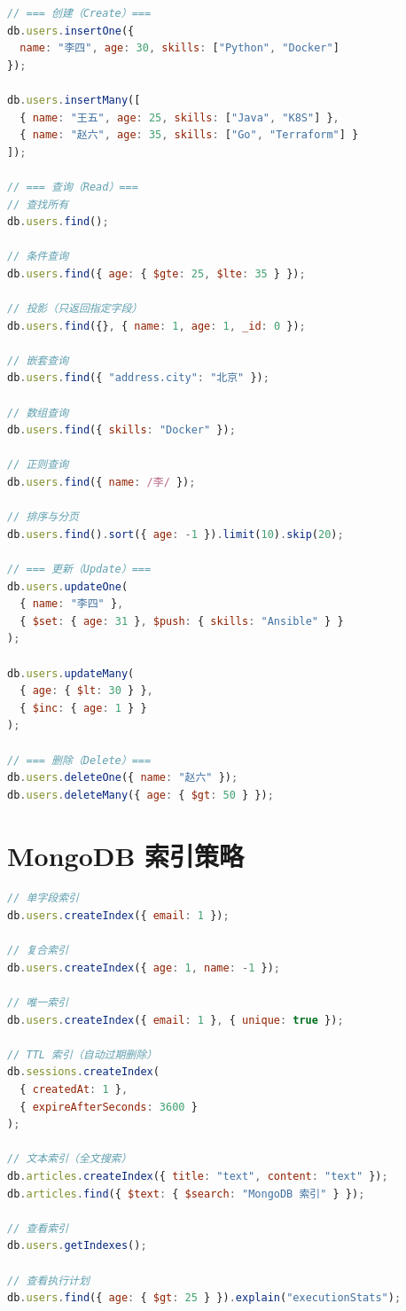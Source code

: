 \documentclass[12pt,UTF8]{ctexbook}
\begin{document}
\begin{lstlisting}[language=javascript]
// === 创建（Create）===
db.users.insertOne({
  name: "李四", age: 30, skills: ["Python", "Docker"]
});

db.users.insertMany([
  { name: "王五", age: 25, skills: ["Java", "K8S"] },
  { name: "赵六", age: 35, skills: ["Go", "Terraform"] }
]);

// === 查询（Read）===
// 查找所有
db.users.find();

// 条件查询
db.users.find({ age: { $gte: 25, $lte: 35 } });

// 投影（只返回指定字段）
db.users.find({}, { name: 1, age: 1, _id: 0 });

// 嵌套查询
db.users.find({ "address.city": "北京" });

// 数组查询
db.users.find({ skills: "Docker" });

// 正则查询
db.users.find({ name: /李/ });

// 排序与分页
db.users.find().sort({ age: -1 }).limit(10).skip(20);

// === 更新（Update）===
db.users.updateOne(
  { name: "李四" },
  { $set: { age: 31 }, $push: { skills: "Ansible" } }
);

db.users.updateMany(
  { age: { $lt: 30 } },
  { $inc: { age: 1 } }
);

// === 删除（Delete）===
db.users.deleteOne({ name: "赵六" });
db.users.deleteMany({ age: { $gt: 50 } });
\end{lstlisting}

\section{MongoDB 索引策略}
\label{sec:mongodb-index}

\begin{lstlisting}[language=javascript]
// 单字段索引
db.users.createIndex({ email: 1 });

// 复合索引
db.users.createIndex({ age: 1, name: -1 });

// 唯一索引
db.users.createIndex({ email: 1 }, { unique: true });

// TTL 索引（自动过期删除）
db.sessions.createIndex(
  { createdAt: 1 },
  { expireAfterSeconds: 3600 }
);

// 文本索引（全文搜索）
db.articles.createIndex({ title: "text", content: "text" });
db.articles.find({ $text: { $search: "MongoDB 索引" } });

// 查看索引
db.users.getIndexes();

// 查看执行计划
db.users.find({ age: { $gt: 25 } }).explain("executionStats");
\end{lstlisting}
\end{document}

